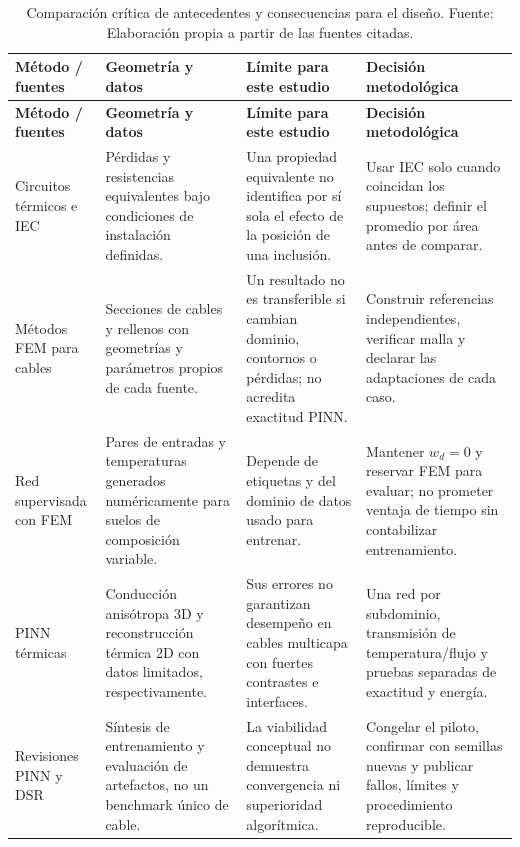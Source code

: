 \begingroup\footnotesize\setlength{\tabcolsep}{3pt}
\begin{longtable}{L{2.4cm}L{3.4cm}L{3.8cm}L{3.9cm}}
\caption{Comparación crítica de antecedentes y consecuencias para el diseño. Fuente: Elaboración propia a partir de las fuentes citadas.}
\label{tab:antecedentes-comparativos}\\
\toprule
\textbf{Método / fuentes} & \textbf{Geometría y datos} & \textbf{Límite para este estudio} & \textbf{Decisión metodológica} \\
\midrule\endfirsthead
\toprule
\textbf{Método / fuentes} & \textbf{Geometría y datos} & \textbf{Límite para este estudio} & \textbf{Decisión metodológica} \\
\midrule\endhead
\bottomrule\endfoot
Circuitos térmicos e IEC \parencites{neher1957}{iec60287} & Pérdidas y resistencias equivalentes bajo condiciones de instalación definidas. & Una propiedad equivalente no identifica por sí sola el efecto de la posición de una inclusión. & Usar IEC solo cuando coincidan los supuestos; definir el promedio por área antes de comparar. \\
Métodos FEM para cables \parencites{aras2005}{oclon2015}{kim2025} & Secciones de cables y rellenos con geometrías y parámetros propios de cada fuente. & Un resultado no es transferible si cambian dominio, contornos o pérdidas; no acredita exactitud PINN. & Construir referencias independientes, verificar malla y declarar las adaptaciones de cada caso. \\
Red supervisada con FEM \parencite{aldulaimi2024} & Pares de entradas y temperaturas generados numéricamente para suelos de composición variable. & Depende de etiquetas y del dominio de datos usado para entrenar. & Mantener $w_d=0$ y reservar FEM para evaluar; no prometer ventaja de tiempo sin contabilizar entrenamiento. \\
PINN térmicas \parencites{xing2023}{pan2025} & Conducción anisótropa 3D y reconstrucción térmica 2D con datos limitados, respectivamente. & Sus errores no garantizan desempeño en cables multicapa con fuertes contrastes e interfaces. & Una red por subdominio, transmisión de temperatura/flujo y pruebas separadas de exactitud y energía. \\
Revisiones PINN y DSR \parencites{lawal2022}{ren2025}{gregor2013} & Síntesis de entrenamiento y evaluación de artefactos, no un benchmark único de cable. & La viabilidad conceptual no demuestra convergencia ni superioridad algorítmica. & Congelar el piloto, confirmar con semillas nuevas y publicar fallos, límites y procedimiento reproducible. \\
\end{longtable}\endgroup

